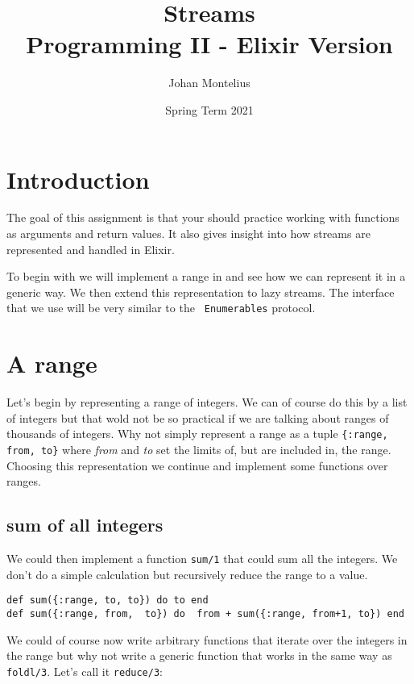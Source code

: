\documentclass[a4paper,11pt]{article}
\begin{document}
\title{
    \textbf{Streams }\\
    \large{Programming II - Elixir Version}
}
\author{Johan Montelius}
\date{Spring Term 2021}
\maketitle
\thispagestyle{fancy}


\section*{Introduction}

The goal of this assignment is that your should practice working with
functions as arguments and return values. It also gives insight into
how streams are represented and handled in Elixir.

To begin with we will implement a range in and see how we can represent
it in a generic way. We then extend this representation to lazy
streams. The interface that we use will be very similar to the {\tt
  Enumerables} protocol.


\section{A range}

Let's begin by representing a range of integers. We can of course do
this by a list of integers but that wold not be so practical if we are
talking about ranges of thousands of integers. Why not simply
represent a range as a tuple {\tt \{:range, from, to\}} where {\em
  from} and {\em to} set the limits of, but are included in, the
range. Choosing this representation we continue and implement some
functions over ranges.

\subsection{sum of all integers}


We could then implement a function {\tt sum/1} that could sum all the
integers. We don't do a simple calculation but recursively reduce the
range to a value. 

\begin{verbatim}
def sum({:range, to, to}) do to end  
def sum({:range, from,  to}) do  from + sum({:range, from+1, to}) end  
\end{verbatim}

We could of course now write arbitrary functions that iterate over the
integers in the range but why not write a generic function that works
in the same way as {\tt foldl/3}. Let's call it {\tt reduce/3}:
\end{document}
